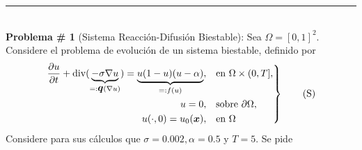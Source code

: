 \documentclass[11pt,letterpaper]{article}
\newcommand{\pd}[2]{\frac{\partial #1}{ \partial #2}}   %
\def\vec   #1{\mbox{\boldmath $#1$}{}}
\DeclareMathOperator{\dive}{div}
\begin{document}
\rule{\linewidth}{0.4mm}\\[20pt]



{\bf Problema \# 1} (Sistema Reacci\'on-Difusi\'on Biestable): Sea $\Omega = [0,1]^2$. Considere el problema de evoluci\'on de un sistema biestable, definido por 
\begin{equation}
\left.
\begin{aligned}
	\pd{u}{t}  +\dive (\underbrace{-\sigma \nabla u}_{=:\vec q(\nabla u)}) = \underbrace{u (1-u)(u-\alpha)}_{=:f(u)}, & \quad \text{en } \Omega \times (0,T],\\
	u = 0, & \quad \text{sobre } \partial \Omega,\\
	u(\cdot,0) = u_0(\vec x), & \quad \text{en } \Omega
\end{aligned}
\right\}\tag{S}
\label{eq:S}
\end{equation}
Considere para sus c\'alculos que $\sigma = 0.002, \alpha = 0.5$ y $T=5$. Se pide
\end{document}
